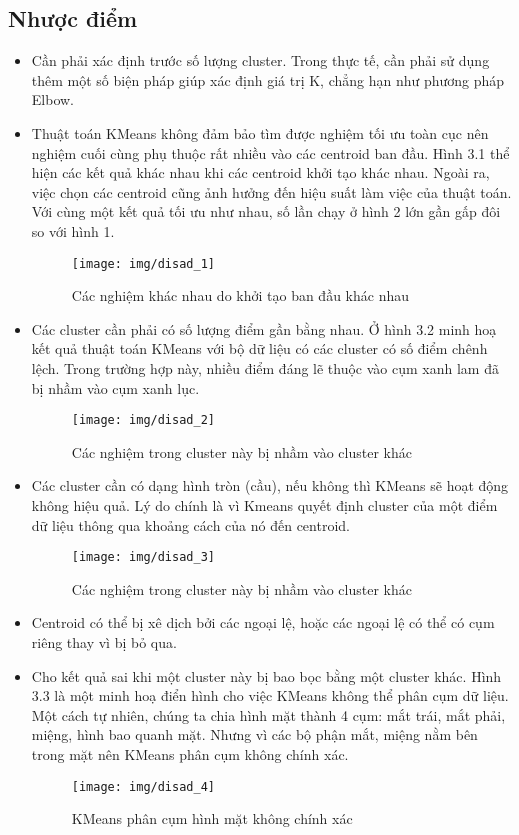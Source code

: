 \documentclass{article}
\begin{document}
\subsection{Nhược điểm}
\begin{itemize}
	\item Cần phải xác định trước số lượng cluster. Trong thực tế, cần phải sử dụng thêm một số biện pháp giúp xác định giá trị K, chẳng hạn như phương pháp Elbow.
	\item Thuật toán KMeans không đảm bảo tìm được nghiệm tối ưu toàn cục nên nghiệm cuối cùng phụ thuộc rất nhiều vào các centroid ban đầu. Hình 3.1 thể hiện các kết quả khác nhau khi các centroid khởi tạo khác nhau. Ngoài ra, việc chọn các centroid cũng ảnh hưởng đến hiệu suất làm việc của thuật toán. Với cùng một kết quả tối ưu như nhau, số lần chạy ở hình 2 lớn gần gấp đôi so với hình 1.\\
	\begin{figure}[h]
		\centering
		\texttt{[image: img/disad\_1]}
		\label{dis1}
		\caption{Các nghiệm khác nhau do khởi tạo ban đầu khác nhau}
	\end{figure}
	\item Các cluster cần phải có số lượng điểm gần bằng nhau. Ở hình 3.2 minh hoạ kết quả thuật toán KMeans với bộ dữ liệu có các cluster có số điểm chênh lệch. Trong trường hợp này, nhiều điểm đáng lẽ thuộc vào cụm xanh lam đã bị nhầm vào cụm xanh lục.\par
	\begin{figure}[h]
		\centering
		\texttt{[image: img/disad\_2]}
		\caption{Các nghiệm trong cluster này bị nhầm vào cluster khác}
	\end{figure}\par
	\item Các cluster cần có dạng hình tròn (cầu), nếu không thì KMeans sẽ hoạt động không hiệu quả. Lý do chính là vì Kmeans quyết định cluster của một điểm dữ liệu thông qua khoảng cách của nó đến centroid.	
	\begin{figure}[h]
		\centering
		\texttt{[image: img/disad\_3]}
		\caption{Các nghiệm trong cluster này bị nhầm vào cluster khác}
	\end{figure}
	\item Centroid có thể bị xê dịch bởi các ngoại lệ, hoặc các ngoại lệ có thể có cụm riêng thay vì bị bỏ qua.
	\item Cho kết quả sai khi một cluster này bị bao bọc bằng một cluster khác. Hình 3.3 là một minh hoạ điển hình cho việc KMeans không thể phân cụm dữ liệu. Một cách tự nhiên, chúng ta chia hình mặt thành 4 cụm: mắt trái, mắt phải, miệng, hình bao quanh mặt. Nhưng vì các bộ phận mắt, miệng nằm bên trong mặt nên KMeans phân cụm không chính xác.
	\begin{figure}[h]
		\centering
		\texttt{[image: img/disad\_4]}
		\caption{KMeans phân cụm hình mặt không chính xác}
	\end{figure}	
\end{itemize}
\end{document}
